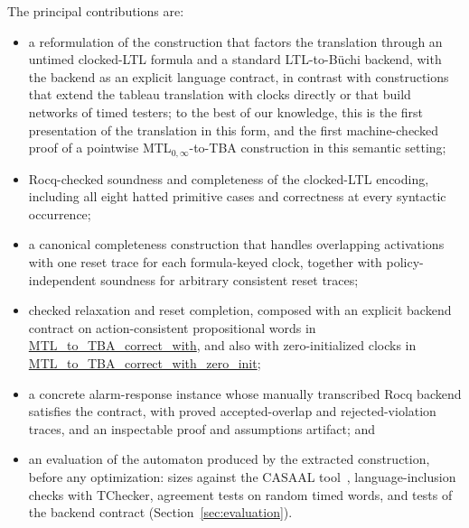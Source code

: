 \documentclass{ieeeaccess}
\newcommand{\Rocqid}[1]{\url{#1}}
\begin{document}
The principal contributions are:
\begin{itemize}
  \item a reformulation of the construction that factors the translation
        through an untimed clocked-LTL formula and a standard
        LTL-to-B\"uchi backend, with the backend as an explicit language
        contract, in contrast with constructions that extend the tableau
        translation with clocks directly or that build networks of timed
        testers; to the best of our knowledge, this is the first
        presentation of the translation in this form, and the first
        machine-checked proof of a pointwise MTL$_{0,\infty}$-to-TBA
        construction in this semantic setting;
  \item Rocq-checked soundness and completeness of the clocked-LTL encoding,
        including all eight hatted primitive cases and
        correctness at every syntactic occurrence;
  \item a canonical completeness construction that handles overlapping
        activations with one reset trace for each formula-keyed clock,
        together with policy-independent soundness for arbitrary consistent
        reset traces;
  \item checked relaxation and reset completion, composed with an explicit
        backend contract on action-consistent propositional words in
        \Rocqid{MTL_to_TBA_correct_with}, and also with zero-initialized
        clocks in \Rocqid{MTL_to_TBA_correct_with_zero_init};
  \item a concrete alarm-response instance whose manually transcribed Rocq
        backend satisfies the contract, with proved accepted-overlap and
        rejected-violation traces, and an inspectable proof and assumptions
        artifact; and
  \item an evaluation of the automaton produced by the extracted
        construction, before any optimization: sizes against the CASAAL tool~\cite{casaal_tool},
        language-inclusion checks with TChecker, agreement tests on random
        timed words, and tests of the backend contract (Section~\ref{sec:evaluation}).
\end{itemize}
\end{document}
